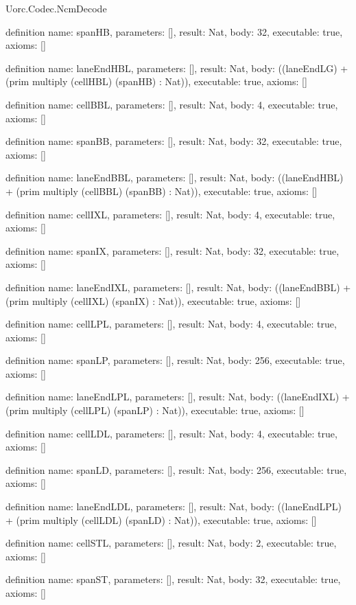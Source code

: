 \begin{lexlean}{Uorc.Codec.NcmDecode}
\begin{semanticmodule}
definition{
  name: spanHB,
  parameters: [],
  result: Nat,
  body: 32,
  executable: true,
  axioms: []
}

definition{
  name: laneEndHBL,
  parameters: [],
  result: Nat,
  body: ((laneEndLG) + (prim multiply (cellHBL) (spanHB) : Nat)),
  executable: true,
  axioms: []
}

definition{
  name: cellBBL,
  parameters: [],
  result: Nat,
  body: 4,
  executable: true,
  axioms: []
}

definition{
  name: spanBB,
  parameters: [],
  result: Nat,
  body: 32,
  executable: true,
  axioms: []
}

definition{
  name: laneEndBBL,
  parameters: [],
  result: Nat,
  body: ((laneEndHBL) + (prim multiply (cellBBL) (spanBB) : Nat)),
  executable: true,
  axioms: []
}

definition{
  name: cellIXL,
  parameters: [],
  result: Nat,
  body: 4,
  executable: true,
  axioms: []
}

definition{
  name: spanIX,
  parameters: [],
  result: Nat,
  body: 32,
  executable: true,
  axioms: []
}

definition{
  name: laneEndIXL,
  parameters: [],
  result: Nat,
  body: ((laneEndBBL) + (prim multiply (cellIXL) (spanIX) : Nat)),
  executable: true,
  axioms: []
}

definition{
  name: cellLPL,
  parameters: [],
  result: Nat,
  body: 4,
  executable: true,
  axioms: []
}

definition{
  name: spanLP,
  parameters: [],
  result: Nat,
  body: 256,
  executable: true,
  axioms: []
}

definition{
  name: laneEndLPL,
  parameters: [],
  result: Nat,
  body: ((laneEndIXL) + (prim multiply (cellLPL) (spanLP) : Nat)),
  executable: true,
  axioms: []
}

definition{
  name: cellLDL,
  parameters: [],
  result: Nat,
  body: 4,
  executable: true,
  axioms: []
}

definition{
  name: spanLD,
  parameters: [],
  result: Nat,
  body: 256,
  executable: true,
  axioms: []
}

definition{
  name: laneEndLDL,
  parameters: [],
  result: Nat,
  body: ((laneEndLPL) + (prim multiply (cellLDL) (spanLD) : Nat)),
  executable: true,
  axioms: []
}

definition{
  name: cellSTL,
  parameters: [],
  result: Nat,
  body: 2,
  executable: true,
  axioms: []
}

definition{
  name: spanST,
  parameters: [],
  result: Nat,
  body: 32,
  executable: true,
  axioms: []
}


\end{semanticmodule}
\end{lexlean}
